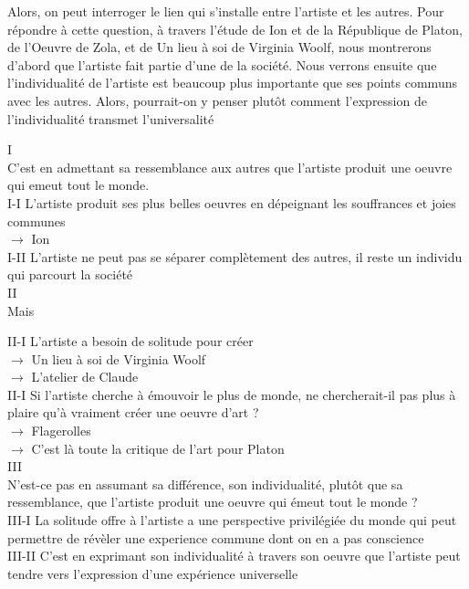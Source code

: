 \documentclass{article}
\begin{document}
Alors, on peut interroger le lien qui s'installe entre l'artiste 
et les autres. 
Pour répondre à cette question, à travers l'étude de Ion et de la 
République de Platon, de l'Oeuvre de Zola, et de Un lieu à soi de 
Virginia Woolf, nous montrerons d'abord que l'artiste fait partie 
d'une de la société. Nous verrons ensuite que l'individualité de 
l'artiste est beaucoup plus importante que ses points communs avec 
les autres. Alors, pourrait-on y penser plutôt comment l'expression 
de l'individualité transmet l'universalité  

\noindent 

I \\ 
C'est en admettant sa ressemblance aux autres que l'artiste produit une 
oeuvre qui emeut tout le monde. \\

I-I L'artiste produit ses plus belles oeuvres en dépeignant les 
souffrances et joies communes \\
\(\rightarrow\) Ion\\

I-II L'artiste ne peut pas se séparer complètement des autres, il reste 
un individu qui parcourt la société \\ 

II \\ 
Mais 

II-I L'artiste a besoin de solitude pour créer \\
\(\rightarrow\) Un lieu à soi de Virginia Woolf \\
\(\rightarrow\) L'atelier de Claude\\

II-I Si l'artiste cherche à émouvoir le plus de monde, ne chercherait-il 
pas plus à plaire qu'à vraiment créer une oeuvre d'art ?\\ 
\(\rightarrow\) Flagerolles \\
\(\rightarrow\) C'est là toute la critique de l'art pour Platon  \\


III \\ 
N'est-ce pas en assumant sa différence, son individualité, plutôt que sa 
ressemblance, que l'artiste produit une oeuvre qui émeut 
tout le monde ? \\ 

III-I La solitude offre à l'artiste a une perspective privilégiée 
du monde qui peut permettre de révèler une experience commune dont 
on en a pas conscience\\

III-II C'est en exprimant son individualité à travers son oeuvre 
que l'artiste peut tendre vers l'expression d'une expérience 
universelle \\ 
\end{document}
